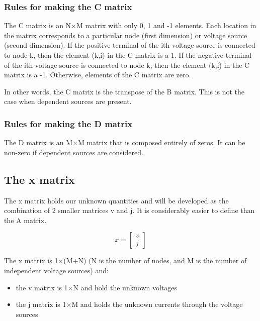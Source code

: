 \documentclass[10pt]{report}
\begin{document}
\subsubsection{Rules for making the C matrix}

The C matrix is an N$\times$M matrix with only 0, 1 and -1 elements.
Each location in the matrix corresponds to a particular node (first
dimension) or voltage source (second dimension).  If the positive
terminal of the ith voltage source is connected to node k, then the
element (k,i) in the C matrix is a 1.  If the negative terminal of the
ith voltage source is connected to node k, then the element (k,i) in
the C matrix is a -1.  Otherwise, elements of the C matrix are zero.

\addvspace{12pt}

In other words, the C matrix is the transpose of the B matrix.  This
is not the case when dependent sources are present.

\subsubsection{Rules for making the D matrix}

The D matrix is an M$\times$M matrix that is composed entirely of
zeros.  It can be non-zero if dependent sources are considered.

\subsection{The x matrix}

The x matrix holds our unknown quantities and will be developed as the
combination of 2 smaller matrices v and j.  It is considerably easier
to define than the A matrix.

\begin{equation}
x =
\begin{bmatrix}
v\\
j
\end{bmatrix}
\end{equation}

The x matrix is 1$\times$(M+N) (N is the number of nodes, and M is the
number of independent voltage sources) and:

\begin{itemize}
\item
the v matrix is 1$\times$N and hold the unknown voltages
\item
the j matrix is 1$\times$M and holds the unknown currents through the
voltage sources
\end{itemize}
\end{document}
